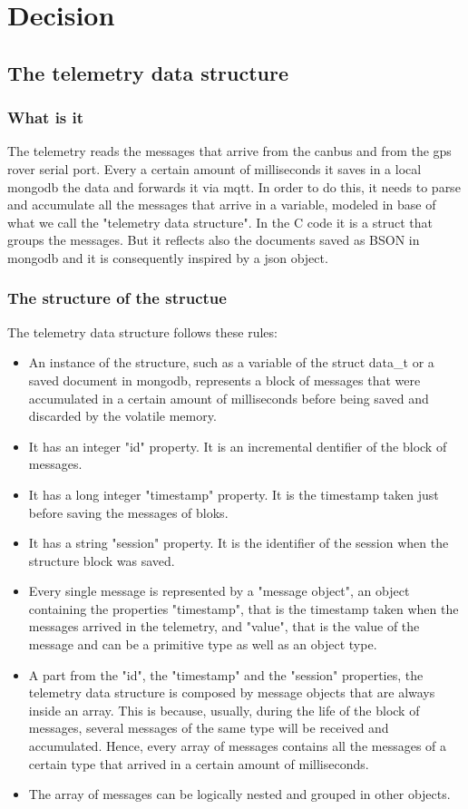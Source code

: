 \section{\huge{Decision}}

\subsection{The telemetry data structure}

\subsubsection{What is it}
The telemetry reads the messages that arrive from the canbus and from the gps rover serial port. Every a certain amount of milliseconds it saves
in a local mongodb the data and forwards it via mqtt. In order to do this, it needs to parse and accumulate all the messages that arrive in 
a variable, modeled in base of what we call the "telemetry data structure". In the C code it is a struct that groups the messages. But it reflects 
also the documents saved as BSON in mongodb and it is consequently inspired by a json object.

\subsubsection{The structure of the structue}
The telemetry data structure follows these rules:
\begin{itemize}
    \item An instance of the structure, such as a variable of the struct data\_t or a saved document in mongodb, represents a block of messages that were accumulated in a certain amount of milliseconds before being saved and discarded by the volatile memory.
    \item It has an integer "id" property. It is an incremental dentifier of the block of messages.
    \item It has a long integer "timestamp" property. It is the timestamp taken just before saving the messages of bloks.
    \item It has a string "session" property. It is the identifier of the session when the structure block was saved.
    \item Every single message is represented by a "message object", an object containing the properties "timestamp", that is the timestamp taken when the messages arrived in the telemetry, and "value", that is the value of the message and can be a primitive type as well as an object type.
    \item A part from the "id", the "timestamp" and the "session" properties, the telemetry data structure is composed by message objects that are always inside an array. This is because, usually, during the life of the block of messages, several messages of the same type will be received and accumulated. Hence, every array of messages contains all the messages of a certain type that arrived in a certain amount of milliseconds.
    \item The array of messages can be logically nested and grouped in other objects.
\end{itemize}

